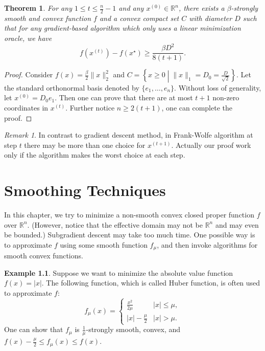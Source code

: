\documentclass[openany]{book}
\newtheorem{theorem}{Theorem}[chapter]
\theoremstyle{definition}
\newtheorem{example}{Example}[chapter]
\theoremstyle{remark}
\newtheorem*{remark}{Remark}
\begin{document}
\begin{theorem}
    For any $1\le t\le \frac{n}{2}-1$ and any $x^{(0)}\in \mathbb{R}^n$, there exists a $\beta$-strongly smooth and convex function $f$ and a convex compact set $C$ with diameter $D$ such that for any gradient-based algorithm which only uses a linear minimization oracle, we have
    \begin{equation}
        f(x^{(t)})-f(x^{\star})\ge \frac{\beta D^2}{8(t+1)}.
    \end{equation}
\end{theorem}
\begin{proof}
    Consider $f(x)=\frac{\beta}{2}\|x\|_2^2$ and $C=\left\{x\ge0\middle|\|x\|_1=D_0=\frac{D}{\sqrt{2}}\right\}$. Let the standard orthonormal basis denoted by $\{e_1,\ldots,e_n\}$. Without loss of generality, let $x^{(0)}=D_0e_1$. Then one can prove that there are at most $t+1$ non-zero coordinates in $x^{(t)}$. Further notice $n\ge2(t+1)$, one can complete the proof.
\end{proof}
\begin{remark}
    In contrast to gradient descent method, in Frank-Wolfe algorithm at step $t$ there may be more than one choice for $x^{(t+1)}$. Actually our proof work only if the algorithm makes the worst choice at each step.
\end{remark}

\chapter{Smoothing Techniques}
In this chapter, we try to minimize a non-smooth convex closed proper function $f$ over $\mathbb{R}^n$. (However, notice that the effective domain may not be $\mathbb{R}^n$ and may even be bounded.) Subgradient descent may take too much time. One possible way is to approximate $f$ using some smooth function $f_{\mu}$, and then invoke algorithms for smooth convex functions.

\begin{example}
    Suppose we want to minimize the absolute value function $f(x)=|x|$. The following function, which is called Huber function, is often used to approximate $f$:
    \begin{equation}
        f_{\mu}(x)=\left\{
        \begin{array}{ll}
            \frac{x^2}{2\mu} & |x|\le\mu, \\
            |x|-\frac{\mu}{2} & |x|>\mu.
        \end{array}
        \right.
    \end{equation}
    One can show that $f_{\mu}$ is $\frac{1}{\mu}$-strongly smooth, convex, and $f(x)-\frac{\mu}{2}\le f_{\mu}(x)\le f(x)$.
\end{example}
\end{document}
